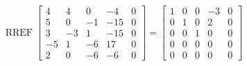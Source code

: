 \begin{exerciseAnswer} 


\[\operatorname{RREF} \left[\begin{array}{cccc|c}
4 & 4 & 0 & -4 & 0 \\
5 & 0 & -1 & -15 & 0 \\
3 & -3 & 1 & -15 & 0 \\
-5 & 1 & -6 & 17 & 0 \\
2 & 0 & -6 & -6 & 0
\end{array}\right] = \left[\begin{array}{cccc|c}
1 & 0 & 0 & -3 & 0 \\
0 & 1 & 0 & 2 & 0 \\
0 & 0 & 1 & 0 & 0 \\
0 & 0 & 0 & 0 & 0 \\
0 & 0 & 0 & 0 & 0
\end{array}\right] \]



\end{exerciseAnswer}
